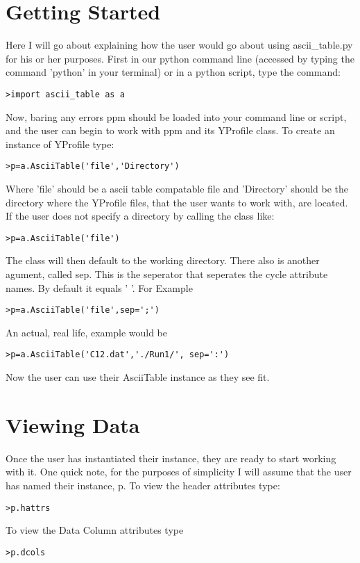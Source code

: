 \section{Getting Started}
Here I will go about explaining how the user would go about using ascii\_table.py for his or her purposes.
First in our python command line (accessed by typing the command 'python' in your terminal) or in a python script,
type the command:
\begin{verbatim}
>import ascii_table as a
\end{verbatim}
Now, baring any errors ppm should be loaded into your command line or script, and the user can begin
to work with ppm and its YProfile class. To create an instance of YProfile type:
\begin{verbatim}
>p=a.AsciiTable('file','Directory')
\end{verbatim}
Where 'file' should be a ascii table compatable file and 'Directory' should be the directory where the YProfile files, that the user wants
to work with, are located. If the user does not specify a directory by calling the class
like: 
\begin{verbatim}
>p=a.AsciiTable('file')
\end{verbatim}
The class will then default to the working directory.\newline
There also is another agument, called sep. This is the seperator that seperates the 
cycle attribute names. By default it equals '  '. For Example
\begin{verbatim}
>p=a.AsciiTable('file',sep=';')
\end{verbatim}
An actual, real life, example would be
\begin{verbatim}
>p=a.AsciiTable('C12.dat','./Run1/', sep=':')
\end{verbatim}

Now the user can use their AsciiTable instance as they see fit.

\section{Viewing Data}
Once the user has instantiated their instance, they are ready to start working with it.
One quick note, for the purposes of simplicity I will assume that the user has named
their instance, p.
\newline
To view the header attributes type:
\begin{verbatim}
>p.hattrs
\end{verbatim}
To view the Data Column attributes type
\begin{verbatim}
>p.dcols
\end{verbatim}

